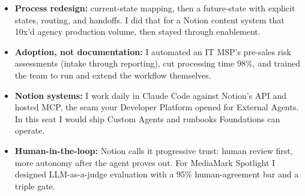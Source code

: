 \documentclass[]{cover}
\begin{document}


\currentdate{\today}




{\raggedright{}\fontsize{11pt}{13pt}\selectfont
\begin{itemize}
    \item \textbf{Process redesign:} current-state mapping, then a future-state with explicit states, routing, and handoffs. I did that for a Notion content system that 10x'd agency production volume, then stayed through enablement.
    \item \textbf{Adoption, not documentation:} I automated an IT MSP's pre-sales risk assessments (intake through reporting), cut processing time 98\%, and trained the team to run and extend the workflow themselves.
    \item \textbf{Notion systems:} I work daily in Claude Code against Notion's API and hosted MCP, the seam your Developer Platform opened for External Agents. In this seat I would ship Custom Agents and runbooks Foundations can operate.
    \item \textbf{Human-in-the-loop:} Notion calls it progressive trust: human review first, more autonomy after the agent proves out. For MediaMark Spotlight I designed LLM-as-a-judge evaluation with a 95\% human-agreement bar and a triple gate.
\end{itemize}\par}
\vspace{6pt}
\end{document}
